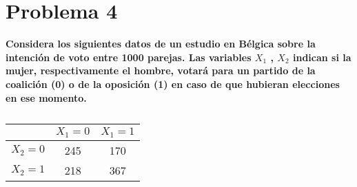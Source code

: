 \section*{Problema 4}

\textbf{Considera los siguientes datos de un estudio en Bélgica sobre la intención de voto entre 1000 parejas. Las variables $X_1$ , $X_2$ indican si la mujer, respectivamente el hombre, votará para un partido de la coalición (0) o de la oposición (1) en caso de que hubieran elecciones en ese momento.}

\begin{table}[H]
	\centering
	\begin{tabular}{c|cc}
		        & $X_1=0$ & $X_1=1$ \\  \hline
		$X_2=0$ & 245     & 170     \\
		$X_2=1$ & 218     & 367
	\end{tabular}
	\caption{}
	\label{table:problema04}
\end{table}

